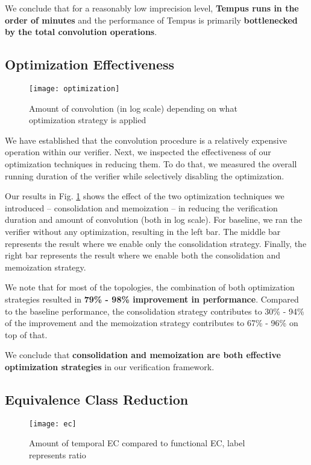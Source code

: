 We conclude that for a reasonably low imprecision level, \textbf{Tempus runs in the order of 
minutes} and the performance of Tempus is primarily \textbf{bottlenecked by the total convolution 
operations}.

\subsection{Optimization Effectiveness}

\begin{figure}[h]
    \centering
    \texttt{[image: optimization]}
    \caption{Amount of convolution (in log scale) depending on what optimization strategy is applied}
    \label{fig:opt}
\end{figure}

We have established that the convolution procedure is a relatively expensive operation within 
our verifier.
Next, we inspected the effectiveness of our optimization techniques in reducing them.
To do that, we measured the overall running duration of the verifier while selectively disabling the 
optimization.

Our results in Fig. \ref{fig:opt} shows the effect of the two optimization techniques we introduced -- 
consolidation and memoization -- in reducing the verification duration and amount of convolution (both in log scale).
For baseline, we ran the verifier without any optimization, resulting in the left bar.
The middle bar represents the result where we enable only the consolidation strategy.
Finally, the right bar represents the result where we enable both the consolidation and memoization strategy.

We note that for most of the topologies, the combination of both optimization strategies resulted in 
\textbf{79\% - 98\% improvement in performance}.
Compared to the baseline performance, the consolidation strategy contributes to 30\% - 94\% of the improvement and
the memoization strategy contributes to 67\% - 96\% on top of that. 

We conclude that \textbf{consolidation and memoization are both effective optimization strategies} in our verification
framework.

\subsection{Equivalence Class Reduction}

\begin{figure}[h]
    \centering
    \texttt{[image: ec]}
    \caption{Amount of temporal EC compared to functional EC, label represents ratio}
    \label{fig:ec}
\end{figure}

